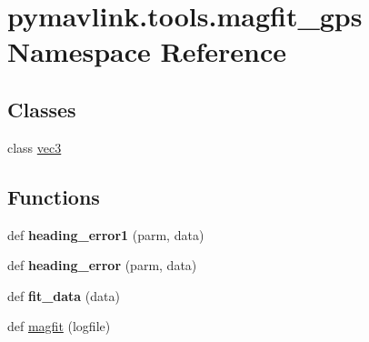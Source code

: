 \hypertarget{namespacepymavlink_1_1tools_1_1magfit__gps}{}\section{pymavlink.\+tools.\+magfit\+\_\+gps Namespace Reference}
\label{namespacepymavlink_1_1tools_1_1magfit__gps}
\subsection*{Classes}
\begin{DoxyCompactItemize}
\item 
class \hyperlink{classpymavlink_1_1tools_1_1magfit__gps_1_1vec3}{vec3}
\end{DoxyCompactItemize}
\subsection*{Functions}
\begin{DoxyCompactItemize}
\item 
\mbox{\label{namespacepymavlink_1_1tools_1_1magfit__gps_a5b1cc8396c886f644e91b514d65ffb02}} 
def {\bfseries heading\+\_\+error1} (parm, data)
\item 
\mbox{\label{namespacepymavlink_1_1tools_1_1magfit__gps_a94af16fde025706f3ef8ee9e8757419b}} 
def {\bfseries heading\+\_\+error} (parm, data)
\item 
\mbox{\label{namespacepymavlink_1_1tools_1_1magfit__gps_a09e741bd02076ffe51d5f7c63a060a89}} 
def {\bfseries fit\+\_\+data} (data)
\item 
def \hyperlink{namespacepymavlink_1_1tools_1_1magfit__gps_a0d9ad9596239f056f8067ad0aa07409a}{magfit} (logfile)
\end{DoxyCompactItemize}
